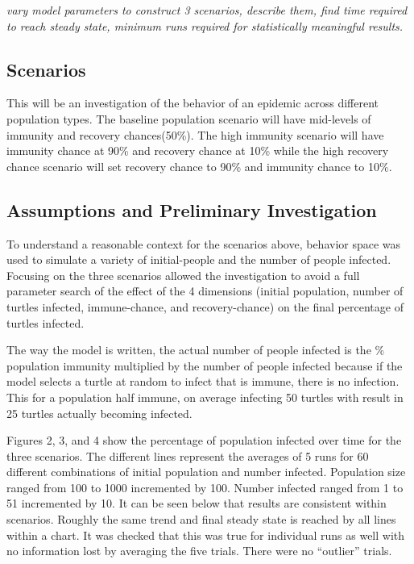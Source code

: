 \documentclass[11pt]{article} %
\begin{document}
\textit{ vary model parameters to construct 3 scenarios, describe them, find time required to reach steady state, minimum runs required for statistically meaningful results. }


\subsection{Scenarios}

This will be an investigation of the behavior of an epidemic across different population types. The baseline population scenario will have mid-levels of immunity and recovery chances(50\%). The high immunity scenario will have immunity chance at 90\% and recovery chance at 10\% while the high recovery chance scenario will set recovery chance to 90\% and immunity chance to 10\%. 

\subsection{Assumptions and Preliminary Investigation}

To understand a reasonable context for the scenarios above, behavior space was used to simulate a variety of initial-people and the number of people infected. Focusing on the three scenarios allowed the investigation to avoid a full parameter search of the effect of the 4 dimensions (initial population, number of turtles infected, immune-chance, and recovery-chance) on the final percentage of turtles infected. 

The way the model is written, the actual number of people infected is the \% population immunity multiplied by the number of people infected because if the model selects a turtle at random to infect that is immune, there is no infection. This for a population half immune, on average infecting 50 turtles with result in 25 turtles actually becoming infected. 

Figures 2, 3, and 4 show the percentage of population infected over time for the three scenarios. The different lines represent the averages of 5 runs for 60 different combinations of initial population and number infected. Population size ranged from 100 to 1000 incremented by 100. Number infected ranged from 1 to 51 incremented by 10. It can be seen below that results are consistent within scenarios. Roughly the same trend and final steady state is reached by all lines within a chart. It was checked that this was true for individual runs as well with no information lost by averaging the five trials. There were no ``outlier'' trials. 
\end{document}
